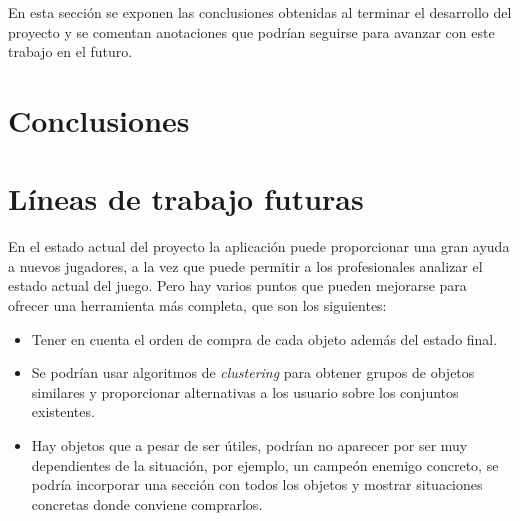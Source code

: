 
En esta sección se exponen las conclusiones obtenidas al terminar el desarrollo del proyecto y se comentan anotaciones que podrían seguirse para avanzar con este trabajo en el futuro.

\section{Conclusiones}


\section{Líneas de trabajo futuras}
En el estado actual del proyecto la aplicación puede proporcionar una gran ayuda a nuevos jugadores, a la vez que puede permitir a los profesionales analizar el estado actual del juego. Pero hay varios puntos que pueden mejorarse para ofrecer una herramienta más completa, que son los siguientes:
\begin{itemize}
	\item Tener en cuenta el orden de compra de cada objeto además del estado final.
	\item Se podrían usar algoritmos de \textit{clustering} para obtener grupos de objetos similares y proporcionar alternativas a los usuario sobre los conjuntos existentes.
	\item Hay objetos que a pesar de ser útiles, podrían no aparecer por ser muy dependientes de la situación, por ejemplo, un campeón enemigo concreto, se podría incorporar una sección con todos los objetos y mostrar situaciones concretas donde conviene comprarlos.
\end{itemize}